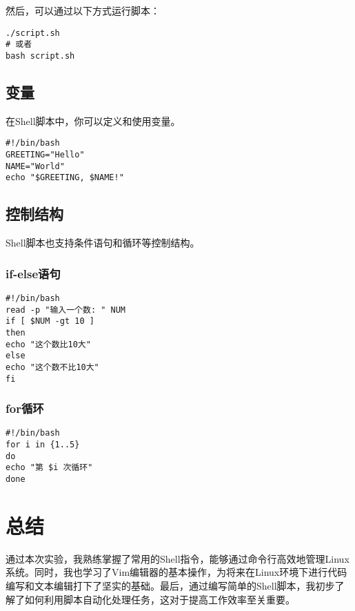 \documentclass[UTF8]{gyh}
\begin{document}
然后，可以通过以下方式运行脚本：

\begin{lstlisting}
./script.sh
# 或者
bash script.sh
\end{lstlisting}

\subsection{变量}

在Shell脚本中，你可以定义和使用变量。

\begin{lstlisting}
#!/bin/bash
GREETING="Hello"
NAME="World"
echo "$GREETING, $NAME!"
\end{lstlisting}

\subsection{控制结构}

Shell脚本也支持条件语句和循环等控制结构。

\subsubsection{if-else语句}

\begin{lstlisting}
#!/bin/bash
read -p "输入一个数: " NUM
if [ $NUM -gt 10 ]
then
echo "这个数比10大"
else
echo "这个数不比10大"
fi
\end{lstlisting}

\subsubsection{for循环}

\begin{lstlisting}
#!/bin/bash
for i in {1..5}
do
echo "第 $i 次循环"
done
\end{lstlisting}

\section{总结}

通过本次实验，我熟练掌握了常用的Shell指令，能够通过命令行高效地管理Linux系统。同时，我也学习了Vim编辑器的基本操作，为将来在Linux环境下进行代码编写和文本编辑打下了坚实的基础。最后，通过编写简单的Shell脚本，我初步了解了如何利用脚本自动化处理任务，这对于提高工作效率至关重要。
\end{document}
